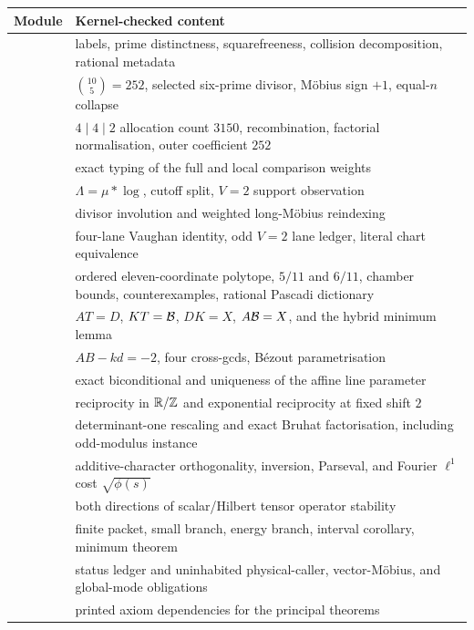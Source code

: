 \begin{center}
\footnotesize
\begin{tabularx}{\textwidth}{@{}P{0.49\textwidth}>{\raggedright\arraybackslash}X@{}}
\toprule
Module & Kernel-checked content \\
\midrule
{}
& labels, prime distinctness, squarefreeness, collision decomposition, rational metadata \\
& $\binom{10}{5}=252$, selected six-prime divisor, M\"obius sign $+1$, equal-$n$ collapse \\
& $4\mid4\mid2$ allocation count $3150$, recombination, factorial normalisation, outer coefficient $252$ \\
& exact typing of the full and local comparison weights \\
& $\Lambda=\mu*\log$, cutoff split, $V=2$ support observation \\
& divisor involution and weighted long-M\"obius reindexing \\
& four-lane Vaughan identity, odd $V=2$ lane ledger, literal chart equivalence \\
& ordered eleven-coordinate polytope, $5/11$ and $6/11$, chamber bounds, counterexamples, rational Pascadi dictionary \\
& $AT=D$, $KT=\mathcal B$, $DK=X$, $A\mathcal B=X$, and the hybrid minimum lemma \\
& $AB-kd=-2$, four cross-gcds, B\'ezout parametrisation \\
& exact biconditional and uniqueness of the affine line parameter \\
& reciprocity in $\mathbb R/\mathbb Z$ and exponential reciprocity at fixed shift $2$ \\
& determinant-one rescaling and exact Bruhat factorisation, including odd-modulus instance \\
& additive-character orthogonality, inversion, Parseval, and Fourier $\ell^1$ cost $\sqrt{\phi(s)}$ \\
& both directions of scalar/Hilbert tensor operator stability \\
& finite packet, small branch, energy branch, interval corollary, minimum theorem \\
& status ledger and uninhabited physical-caller, vector-M\"obius, and global-mode obligations \\
& printed axiom dependencies for the principal theorems \\
\bottomrule
\end{tabularx}
\end{center}
\normalsize

